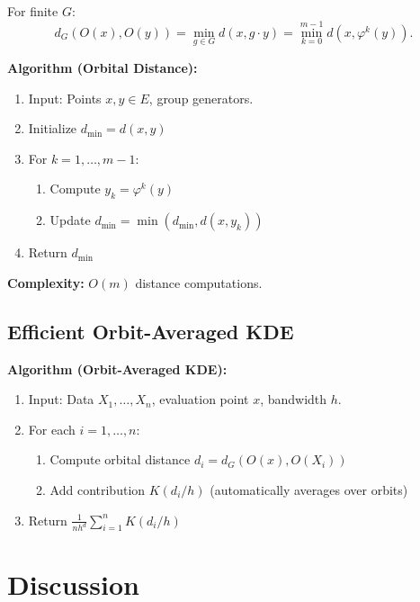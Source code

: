 \documentclass[11pt]{article}
\begin{document}
For finite $G$:
\begin{equation}\label{eq:orbital_distance}
d_G(O(x), O(y)) = \min_{g \in G} d(x, g \cdot y) = \min_{k=0}^{m-1} d(x, \varphi^k(y)).
\end{equation}

\textbf{Algorithm (Orbital Distance):}
\begin{enumerate}
\item Input: Points $x, y \in E$, group generators.
\item Initialize $d_{\min} = d(x, y)$
\item For $k = 1, \ldots, m-1$:
\begin{enumerate}
\item Compute $y_k = \varphi^k(y)$
\item Update $d_{\min} = \min(d_{\min}, d(x, y_k))$
\end{enumerate}
\item Return $d_{\min}$
\end{enumerate}

\textbf{Complexity:} $O(m)$ distance computations.

\subsection{Efficient Orbit-Averaged KDE}

\textbf{Algorithm (Orbit-Averaged KDE):}
\begin{enumerate}
\item Input: Data $X_1, \ldots, X_n$, evaluation point $x$, bandwidth $h$.
\item For each $i = 1, \ldots, n$:
\begin{enumerate}
\item Compute orbital distance $d_i = d_G(O(x), O(X_i))$
\item Add contribution $K(d_i/h)$ (automatically averages over orbits)
\end{enumerate}
\item Return $\frac{1}{nh^d} \sum_{i=1}^n K(d_i/h)$
\end{enumerate}

\section{Discussion}
\label{sec:discussion}
\end{document}
